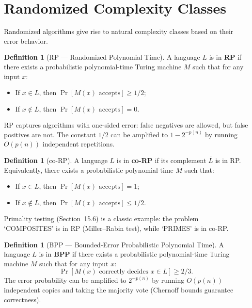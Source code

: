 \documentclass[twoside,12pt]{book}
\theoremstyle{plain}
\theoremstyle{definition}
\newtheorem{definition}[theorem]{Definition}
\theoremstyle{remark}
\begin{document}
\section{Randomized Complexity Classes}
\label{app:sec:randomized-classes}

Randomized algorithms give rise to natural complexity classes based on
their error behavior.

\begin{definition}[RP --- Randomized Polynomial Time]
A language $L$ is in \textbf{RP} if there exists a probabilistic
polynomial-time Turing machine $M$ such that for any input $x$:
\begin{itemize}
\item If $x \in L$, then $\Pr[M(x) \text{ accepts}] \geq 1/2$;
\item If $x \notin L$, then $\Pr[M(x) \text{ accepts}] = 0$.
\end{itemize}
\end{definition}

RP captures algorithms with one-sided error: false negatives are allowed,
but false positives are not. The constant $1/2$ can be amplified to
$1 - 2^{-p(n)}$ by running $O(p(n))$ independent repetitions.

\begin{definition}[co-RP]
A language $L$ is in \textbf{co-RP} if its complement $\bar{L}$ is in RP.
Equivalently, there exists a probabilistic polynomial-time $M$ such that:
\begin{itemize}
\item If $x \in L$, then $\Pr[M(x) \text{ accepts}] = 1$;
\item If $x \notin L$, then $\Pr[M(x) \text{ accepts}] \leq 1/2$.
\end{itemize}
\end{definition}

Primality testing (Section~15.6) is a classic example: the problem
`COMPOSITES' is in RP (Miller--Rabin test), while `PRIMES' is in co-RP.

\begin{definition}[BPP --- Bounded-Error Probabilistic Polynomial Time]
A language $L$ is in \textbf{BPP} if there exists a probabilistic
polynomial-time Turing machine $M$ such that for any input $x$:
\[
\Pr[M(x) \text{ correctly decides } x \in L] \geq 2/3.
\]
The error probability can be amplified to $2^{-p(n)}$ by running
$O(p(n))$ independent copies and taking the majority vote (Chernoff
bounds guarantee correctness).
\end{definition}
\end{document}
